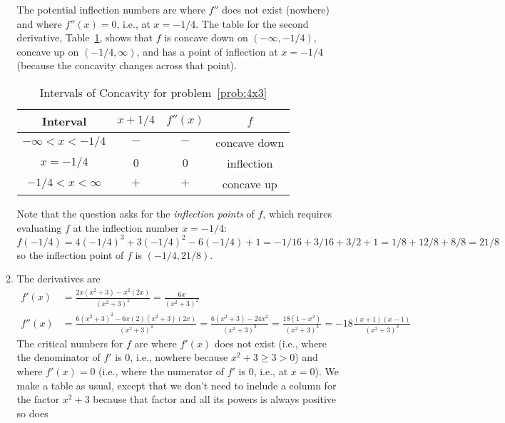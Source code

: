 \documentclass{article}
\begin{document}
\begin{enumerate}
\begin{enumerate}
    The potential inflection numbers are where $f''$ does not exist
    (nowhere) and where $f''(x)=0$, i.e., at $x=-1/4$.  The table for
    the second derivative, Table~\ref{tab:4x3fpp}, shows that $f$ is
    concave down on $(-\infty,-1/4)$, concave up on $(-1/4,\infty)$,
    and has a point of inflection at $x=-1/4$ (because the concavity
    changes across that point).
    \begin{table}[htbp]
      \centering
      \begin{tabular}{|c|c|c|c|}
        \hline
        Interval         & $x+1/4$ & $f''(x)$ & $f$
        \\
        \hline\hline
        $-\infty<x<-1/4$ & $-$     & $-$      & concave down
        \\
        \hline
        $x=-1/4$         & $0$     & $0$      & inflection
        \\
        \hline
        $-1/4<x<\infty$  & $+$     & $+$      & concave up
        \\
        \hline
      \end{tabular}
      \caption{Intervals of Concavity for problem~\ref{prob:4x3}}
      \label{tab:4x3fpp}
    \end{table}
    Note that the question asks for the \emph{inflection points} of
    $f$, which requires evaluating $f$ at the inflection number
    $x=-1/4$:
    \begin{equation*}
      f(-1/4) = 4(-1/4)^3 + 3(-1/4)^2 - 6(-1/4) + 1 = -1/16 + 3/16 + 3/2 + 1
      = 1/8 + 12/8 + 8/8 = 21/8
    \end{equation*}
    so the inflection point of $f$ is $(-1/4,21/8)$.
  \item\label{prob:x2ox2+3} %
    The derivatives are
    \begin{align*}
      f'(x) &= \frac{2x(x^2+3)-x^2(2x)}{(x^2+3)^2} = \frac{6x}{(x^2+3)^2} \\
      f''(x) &= \frac{6(x^2+3)^2-6x(2)(x^2+3)(2x)}{(x^2+3)^4}
      = \frac{6(x^2+3)-24x^2}{(x^2+3)^3} = \frac{18(1-x^2)}{(x^2+3)^3}
      = -18 \frac{(x+1)(x-1)}{(x^2+3)^3}
    \end{align*}
    The critical numbers for $f$ are where $f'(x)$ does not exist
    (i.e., where the denominator of $f'$ is $0$, i.e., nowhere because
    $x^2+3\ge 3>0$) and where $f'(x)=0$ (i.e., where the numerator of
    $f'$ is $0$, i.e., at $x=0$).  We make a table as usual, except
    that we don't need to include a column for the factor $x^2+3$
    because that factor and all its powers is always positive so does

\end{enumerate}
\end{enumerate}
\end{document}
